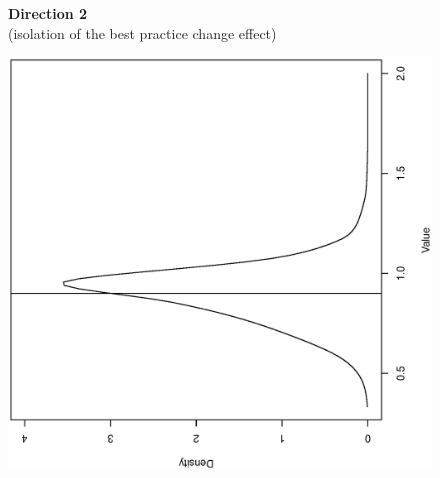 \documentclass[11pt,a4paper,oneside]{article}
\begin{document}
\begin{figure}[htbp]
\vspace{2mm}
  {{\bf Direction 2} \\{\footnotesize (isolation of the best practice change effect)} }\\
  \hspace{-35mm}
  \begin{minipage}[c]{0.30\textwidth}
  \centering
  \begin{turn}{-90}
  \includegraphics[width=\textwidth,height=1.0\textwidth]{Direction.2/gml_BPC_DEA_locfit_2009-2013.ps}
  \end{turn}
  \end{minipage}
  \begin{minipage}[c]{0.30\textwidth}
  \centering
  \begin{turn}{-90}

\end{turn}
\end{minipage}
\end{figure}
\end{document}
